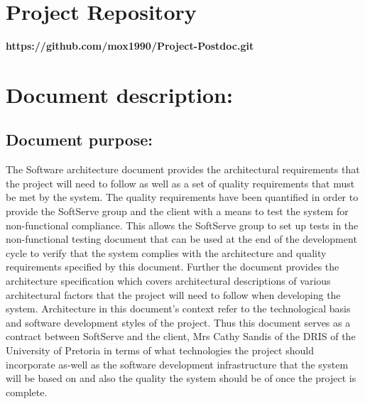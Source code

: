 \documentclass[12pt]{article}
\newcommand{\repo}{https://github.com/mox1990/Project-Postdoc.git}
\begin{document}
\listoffigures
\newpage
\section{Project Repository}
\textbf{\repo}
\newpage
\section{Document description:}


\subsection{Document purpose:}
\vspace{0.2in}
The Software architecture document provides the architectural requirements that the project will need to follow as well as a set of quality requirements that must be met by the system. The quality requirements have been quantified in order to provide the SoftServe group and the client with a means to test the system for non-functional compliance. This allows the SoftServe group to set up tests in the non-functional testing document that can be used at the end of the development cycle to verify that the system complies with the architecture and quality requirements specified by this document. Further the document provides the architecture specification which covers architectural descriptions of various architectural factors that the project will need to follow when developing the system.  Architecture in this document's context refer to the technological basis and software development styles of the project. Thus this document serves as a contract between SoftServe and the client, Mrs Cathy Sandis of the DRIS of the University of Pretoria in terms of what technologies the project should incorporate as-well as the software development infrastructure that the system will be based on and also the quality the system should be of once the project is complete.
\vspace{0.2in}
\end{document}
